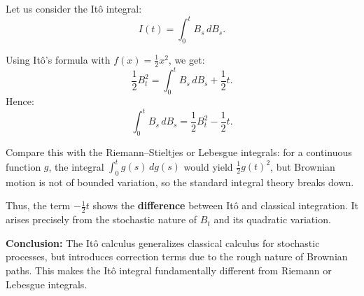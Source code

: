 Let us consider the Itô integral:
\[
I(t) = \int_0^t B_s \, dB_s.
\]

Using Itô’s formula with \( f(x) = \frac{1}{2}x^2 \), we get:
\[
\frac{1}{2}B_t^2 = \int_0^t B_s \, dB_s + \frac{1}{2}t.
\]
Hence:
\[
\int_0^t B_s \, dB_s = \frac{1}{2}B_t^2 - \frac{1}{2}t.
\]

Compare this with the Riemann–Stieltjes or Lebesgue integrals: for a continuous function \( g \), the integral \( \int_0^t g(s) \, dg(s) \) would yield \( \frac{1}{2}g(t)^2 \), but Brownian motion is not of bounded variation, so the standard integral theory breaks down.

Thus, the term \( -\frac{1}{2}t \) shows the \textbf{difference} between Itô and classical integration. It arises precisely from the stochastic nature of \( B_t \) and its quadratic variation.

\textbf{Conclusion:}  
The Itô calculus generalizes classical calculus for stochastic processes, but introduces correction terms due to the rough nature of Brownian paths. This makes the Itô integral fundamentally different from Riemann or Lebesgue integrals.